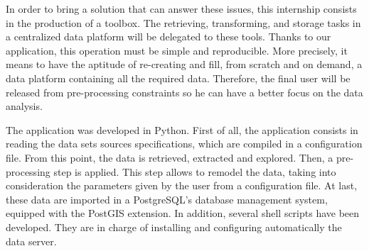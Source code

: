 In order to bring a solution that can answer these issues, this internship consists in the production of a toolbox. The retrieving, transforming, and storage tasks in a centralized data platform will be delegated to these tools. Thanks to our application, this operation must be simple and reproducible. More precisely, it means to have the aptitude of re-creating and fill, from scratch and on demand, a data platform containing all the required data. Therefore, the final user will be released from pre-processing constraints so he can have a better focus on the data analysis.

The application was developed in Python. First of all, the application consists in reading the data sets sources specifications, which are compiled in a configuration file. From this point, the data is retrieved, extracted and explored. Then, a pre-processing step is applied. This step allows to remodel the data, taking into consideration the parameters given by the user from a configuration file. At last, these data are imported in a PostgreSQL's database management system, equipped with the PostGIS extension. In addition, several shell scripts have been developed. They are in charge of installing and configuring automatically the data server.

\clearpage
